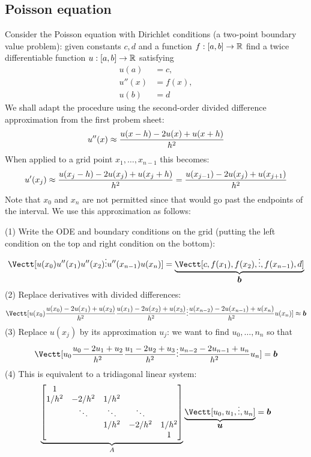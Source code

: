 \subsection{Poisson equation}
Consider the Poisson equation with Dirichlet conditions (a two-point boundary value problem): given constants $c,d$ and a function $f : [a,b] \rightarrow {\mathbb R}$ find a twice differentiable function $u : [a,b] \rightarrow {\mathbb R}$ satisfying
\begin{align*}
u(a) &= c, \\
u''(x) &= f(x), \\
u(b) &= d
\end{align*}
We shall adapt the procedure using the second-order divided difference approximation from the first probem sheet:
\[
u''(x) \ensuremath{\approx} {u(x-h) - 2u(x) + u(x+h)\over h^2}
\]
When applied to a grid point $x_1,\ensuremath{\ldots},x_{n-1}$ this becomes:
\[
u'(x_j) \ensuremath{\approx} {u(x_j-h) - 2u(x_j) + u(x_j+h)\over h^2} = {u(x_{j-1}) - 2u(x_j) + u(x_{j+1})\over h^2}
\]
Note that $x_0$ and $x_n$ are not permitted since that would go past the endpoints of the interval. We use this approximation as follows:

(1) Write the ODE and boundary conditions on the grid (putting the left condition on the top and right condition on the bottom):
\[
\Vectt[u(x_0) \\ 
u''(x_1) \\
u''(x_2) \\
\ensuremath{\vdots} \\
u''(x_{n-1}) \\
u(x_n)] = \underbrace{\Vectt[c, f(x_1), f(x_2), \ensuremath{\vdots} , f(x_{n-1}), d]}_{\ensuremath{\bm{\b}}}
\]
(2) Replace derivatives with divided differences:
\[
\Vectt[u(x_0) \\ 
{u(x_0) - 2u(x_1) + u(x_2)\over h^2} \\
{u(x_1) - 2u(x_2) + u(x_3)\over h^2} \\
\ensuremath{\vdots} \\
{u(x_{n-2}) - 2u(x_{n-1}) + u(x_n)\over h^2} \\
u(x_n)] \ensuremath{\approx} \ensuremath{\bm{\b}}
\]
(3) Replace $u(x_j)$  by its approximation $u_j$: we want to find $u_0,\ensuremath{\ldots},n_n$ so that
\[
\Vectt[u_0 \\ 
{u_0 - 2u_1 + u_2\over h^2} \\
{u_1 - 2u_2 + u_3\over h^2} \\
\ensuremath{\vdots} \\
{u_{n-2} - 2u_{n-1} + u_n\over h^2} \\
u_n] = \ensuremath{\bm{\b}}
\]
(4) This is equivalent to a tridiagonal linear system:
\[
\underbrace{\begin{bmatrix}
    1 \\ 
    1/h^2 & -2/h^2 & 1/h^2 \\
    & \ensuremath{\ddots} & \ensuremath{\ddots} & \ensuremath{\ddots} \\
   && 1/h^2 & -2/h^2 & 1/h^2 \\ 
   &&&& 1 \end{bmatrix}}_A \underbrace{\Vectt[u_0,u_1,\ensuremath{\vdots},u_n]}_{\ensuremath{\bm{\u}}} = \ensuremath{\bm{\b}}
\]


